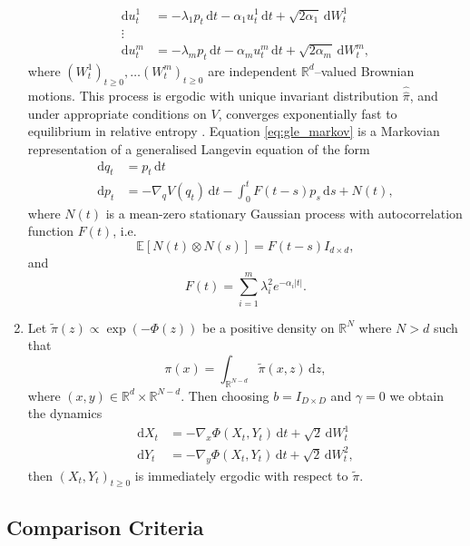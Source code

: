 \begin{enumerate}
\begin{equation}
\begin{aligned}
    \mathrm{d}u^{1}_t &= -\lambda_1 p_t\,\mathrm{d}t -\alpha_1 u^{1}_t\,\mathrm{d}t + \sqrt{2\alpha_1 }\,\mathrm{d}W^{1}_t\\
    \vdots &  \\
    \mathrm{d}u^{m}_t &= -\lambda_m p_t\,\mathrm{d}t -\alpha_m u^{m}_t\,\mathrm{d}t + \sqrt{2\alpha_m }\,\mathrm{d}W^{m}_t,
  \end{aligned}
  \end{equation}
  where $(W^1_t)_{t\ge0}, \ldots (W^m_t)_{t\ge0}$ are independent $\mathbb{R}^d$--valued Brownian motions.   This process is ergodic with unique invariant distribution $\widehat{\widehat{\pi}}$, and under appropriate conditions on $V$, converges exponentially fast to equilibrium in relative entropy \cite{ottobre2011asymptotic}.  Equation \eqref{eq:gle_markov} is a Markovian representation of a generalised Langevin equation of the form
  \begin{align*}
  \mathrm{d}q_t &= p_t \,\mathrm{d}t \\
  \mathrm{d}p_t &= -\nabla_{q}V(q_t) \,\mathrm{d}t - \int_0^t F(t-s)p_s\,\mathrm{d}s + N(t),
  \end{align*}
  where $N(t)$ is a mean-zero stationary Gaussian process with autocorrelation function $F(t)$, i.e.
  $$
    \mathbb{E}\left[ N(t) \otimes N(s) \right] = F(t-s)I_{d\times d},
  $$
  and 
  $$
    F(t) = \sum_{i=1}^{m} \lambda_i^2 e^{-\alpha_i|t|}.
  $$

  \item Let $\widetilde{\pi}(z) \propto \exp(-\Phi(z))$ be a positive density on $\mathbb{R}^N$ where $N > d$ such that 
  $$
    \pi(x) = \int_{\mathbb{R}^{N-d}}\widetilde{\pi}(x,z)\,\mathrm{d}z,
  $$
  where $(x, y)\in \mathbb{R}^d\times \mathbb{R}^{N-d}$. Then choosing $b = I_{D\times D}$ and $\gamma = 0$ we obtain the dynamics
  \begin{align*}
      \mathrm{d}X_t &= -\nabla_x \Phi(X_t, Y_t)\,\mathrm{d}t + \sqrt{2}\,\mathrm{d}W^{1}_t \\ 
      \mathrm{d}Y_t &= -\nabla_y \Phi(X_t, Y_t)\,\mathrm{d}t + \sqrt{2}\,\mathrm{d}W^{2}_t,
  \end{align*}
  then  $(X_t, Y_t)_{t\ge0}$ is immediately ergodic with respect to $\widetilde{\pi}$.
\end{enumerate}

\subsection{Comparison Criteria}
\label{sec:comparison}


